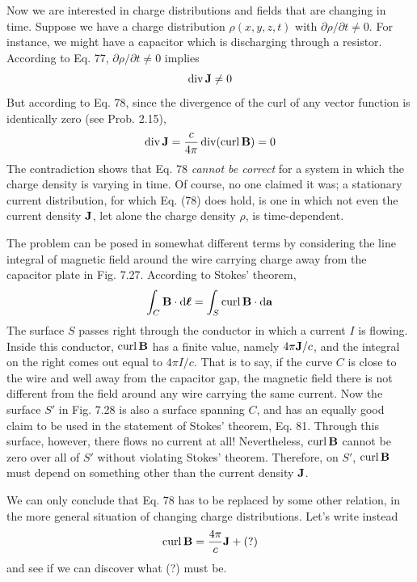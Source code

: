 Now we are interested in charge distributions and fields that are
changing in time. Suppose we have a charge distribution $\rho(x,y,z,t)$
with $\partial\rho/\partial t\ne 0$. For instance, we might have a capacitor which is
discharging through a resistor. According to Eq. 77, $\partial\rho/\partial t\ne 0$
implies
\begin{equation}
  \operatorname{div}\mathbf{J} \ne 0
\end{equation}
But according to Eq. 78, since the divergence of the curl of any
vector function is identically zero (see Prob. 2.15),
\begin{equation}
  \operatorname{div}\mathbf{J} = \frac{c}{4\pi}\operatorname{div}(\operatorname{curl}\mathbf{B}) = 0
\end{equation}
The contradiction shows that Eq. 78 \emph{cannot be correct} for a system
in which the charge density is varying in time. Of course, no one
claimed it was; a stationary current distribution, for which Eq. (78)
does hold, is one in which not even the current density $\mathbf{J}$, let alone the
charge density $\rho$, is time-dependent.

The problem can be posed in somewhat different terms by considering
the line integral of magnetic field around the wire carrying
charge away from the capacitor plate in Fig. 7.27. According to
Stokes' theorem,
\begin{equation}
  \int_C \mathbf{B}\cdot\textup{d}\boldsymbol{\ell} = \int_S \operatorname{curl}\mathbf{B}\cdot\textup{d}\mathbf{a}
\end{equation}
The surface $S$ passes right through the conductor in which a current
$I$ is flowing. Inside this conductor, $\operatorname{curl}\mathbf{B}$ has a finite value,
namely $4\pi\mathbf{J}/c$, and the integral on the right comes out equal to $4\pi I/c$.
That is to say, if the curve $C$ is close to the wire and well away from
the capacitor gap, the magnetic field there is not different from the
field around any wire carrying the same current. Now the surface $S'$
in Fig. 7.28 is also a surface spanning $C$, and has an equally good
claim to be used in the statement of Stokes' theorem, Eq. 81.
Through this surface, however, there flows no current at all! 
Nevertheless, $\operatorname{curl}\mathbf{B}$ cannot be zero over all of $S'$ without violating Stokes'
theorem. Therefore, on $S'$, $\operatorname{curl}\mathbf{B}$ must depend on something other
than the current density $\mathbf{J}$.

We can only conclude that Eq. 78 has to be replaced by some
other relation, in the more general situation of changing charge 
distributions. Let's write instead
\begin{equation}
  \operatorname{curl}\mathbf{B} = \frac{4\pi}{c}\mathbf{J} + (?)
\end{equation}
and see if we can discover what (?) must be.

